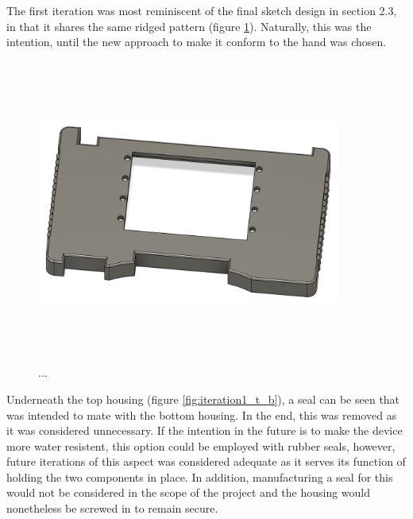 The first iteration was most reminiscent of the final sketch design in section 2.3, in that it shares the same ridged pattern (figure \ref{fig:iteration1_t_f}).
Naturally, this was the intention, until the new approach to make it conform to the hand was chosen.

\begin{figure} [h]
    \centering
    \includegraphics[width=10cm,height=10cm,keepaspectratio]{Figures/iteration1_top_front.png}
    \caption{...}
    \label{fig:iteration1_t_f}
\end{figure}

Underneath the top housing (figure \ref{fig:iteration1_t_b}), a seal can be seen that was intended to mate with the bottom housing.
In the end, this was removed as it was considered unnecessary.
If the intention in the future is to make the device more water resistent, this option could be employed with rubber seals, however, future iterations of this aspect was considered adequate as it serves its function of holding the two components in place.
In addition, manufacturing a seal for this would not be considered in the scope of the project and the housing would nonetheless be screwed in to remain secure.


